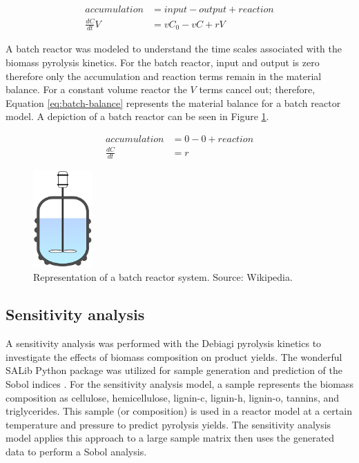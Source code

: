 \begin{equation}
    \label{eq:typical-balance}
    \begin{aligned}
        accumulation &= input - output + reaction \\
        \frac{dC}{dt} V &= v C_0 - v C + r V
    \end{aligned}
\end{equation}

A batch reactor was modeled to understand the time scales associated with the biomass pyrolysis kinetics. For the batch reactor, input and output is zero therefore only the accumulation and reaction terms remain in the material balance. For a constant volume reactor the $V$ terms cancel out; therefore, Equation \ref{eq:batch-balance} represents the material balance for a batch reactor model. A depiction of a batch reactor can be seen in Figure \ref{fig:batch-reactor}.

\begin{equation}
    \label{eq:batch-balance}
    \begin{aligned}
        accumulation &= 0 - 0 + reaction \\
        \frac{dC}{dt} &= r
    \end{aligned}
\end{equation}

\begin{figure}[H]
    \centering
    \includegraphics[width=0.2\textwidth]{figures/batch-reactor.png}
    \caption{Representation of a batch reactor system. Source: Wikipedia.}
    \label{fig:batch-reactor}
\end{figure}

\subsection{Sensitivity analysis}

A sensitivity analysis was performed with the Debiagi pyrolysis kinetics to investigate the effects of biomass composition on product yields. The wonderful SALib Python package was utilized for sample generation and prediction of the Sobol indices \cite{Herman-2017}. For the sensitivity analysis model, a sample represents the biomass composition as cellulose, hemicellulose, lignin-c, lignin-h, lignin-o, tannins, and triglycerides. This sample (or composition) is used in a reactor model at a certain temperature and pressure to predict pyrolysis yields. The sensitivity analysis model applies this approach to a large sample matrix then uses the generated data to perform a Sobol analysis.
